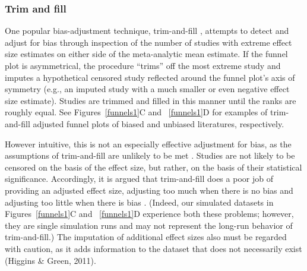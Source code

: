 \documentclass[man]{apa6}
\begin{document}
\subsubsection{Trim and fill}
One popular bias-adjustment technique, trim-and-fill \citep{Duval:Tweedie:2000}, attempts to detect and adjust for bias through inspection of the number of studies with extreme effect size estimates on either side of the meta-analytic mean estimate. If the funnel plot is asymmetrical, the procedure ``trims'' off the most extreme study and imputes a hypothetical censored study reflected around the funnel plot's axis of symmetry (e.g., an imputed study with a much smaller or even negative effect size estimate). Studies are trimmed and filled in this manner until the ranks are roughly equal. See Figures~\ref{funnels1}C and ~\ref{funnels1}D for examples of trim-and-fill adjusted funnel plots of biased and unbiased literatures, respectively. 

However intuitive, this is not an especially effective adjustment for bias, as the assumptions of trim-and-fill are unlikely to be met \citep{Simonsohn:etal:2014b}. Studies are not likely to be censored on the basis of the effect size, but rather, on the basis of their statistical significance. Accordingly, it is argued that trim-and-fill does a poor job of providing an adjusted effect size, adjusting too much when there is no bias and adjusting too little when there is bias \citep{Simonsohn:etal:2014b}. %
(Indeed, our simulated datasets in Figures~\ref{funnels1}C and ~\ref{funnels1}D experience both these problems; however, they are single simulation runs and may not represent the long-run behavior of trim-and-fill.) %
The imputation of additional effect sizes also must be regarded with caution, as it adds information to the dataset that does not necessarily exist (Higgins \& Green, 2011). 
\nocite{Higgins:Green:2011}
\end{document}
